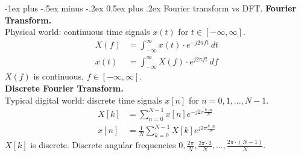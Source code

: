 \documentclass[10pt,landscape,a4paper]{article}
\makeatletter
\renewcommand{\section}{\@startsection{section}{1}{0mm}%
	{-1ex plus -.5ex minus -.2ex}%
	{0.5ex plus .2ex}%
	{\normalfont\large\bfseries}}
\makeatother
\begin{document}
\begin{multicols}{3}
	\section{Fourier transform vs DFT.}
	\textbf{Fourier Transform.}\\
	Physical world: continuous time signals $ x(t) $  for $ t \in \left[-\infty,\infty\right] $.\\
	\begin{align*}
		X(f) & = \int_{-\infty}^{\infty}{x(t)\cdot e^{-j2\pi ft}~dt} \\
		x(t) & = \int_{-\infty}^{\infty}{X(f)\cdot e^{j2\pi ft}~df}
	\end{align*}
	$ X(f) $ is continuous, $ f\in \left[-\infty,\infty\right] $.\\
	\textbf{Discrete Fourier Transform.}\\
	Typical digital world: discrete time signals $ x[n] $ for $ n=0,1,...,N-1 $.
	\begin{align*}
		X[k] & = \sum_{n=0}^{N-1}{x[n]e^{-j2\pi \frac{k\cdot n}{N}}}           \\
		x[n] & = \frac{1}{N}\sum_{k=0}^{N-1}{X[k]e^{j2\pi \frac{k\cdot n}{N}}}
	\end{align*}
	$ X[k] $ is discrete. Discrete angular frequencies $ 0,\frac{2\pi}{N},\frac{2\pi\cdot2}{N},...,\frac{2\pi\cdot(N-1)}{N} $.
	

\end{multicols}
\end{document}
